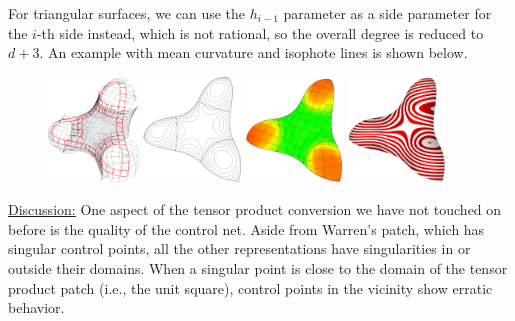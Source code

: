 \documentclass{article}
\begin{document}
For triangular surfaces, we can use the $h_{i-1}$ parameter as a side parameter for the $i$-th
side instead, which is not rational, so the overall degree is reduced to $d+3$.
An example with mean curvature and isophote lines is shown below.
\begin{figure}[h!]
  \includegraphics[width = 0.2139\textwidth]{images/trebol3-cnet.png}
  \hfill
  \includegraphics[width = 0.23\textwidth]{images/trebol3-contour.jpg}
  \hfill
  \includegraphics[width = 0.23\textwidth]{images/trebol3-mean-iso.jpg}
  \hfill
  \includegraphics[width = 0.23\textwidth]{images/trebol3-zebra.jpg}
\end{figure}

\vspace{10pt}
\noindent\underline{Discussion:}\vspace{0.2em}\newline
One aspect of the tensor product conversion we have not touched on before is the quality of the
control net. Aside from Warren's patch, which has singular control points,
all the other representations have singularities in or outside their domains.
When a singular point is close to the domain of the tensor product patch (i.e., the unit square),
control points in the vicinity show erratic behavior.
\end{document}
